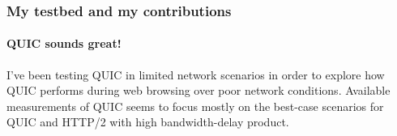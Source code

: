
\begin{frame}
    \frametitle{My testbed and my contributions}
    \framesubtitle{QUIC sounds great!}

    \begin{overprint}
        \uncover<+->{}

        I've been testing QUIC in limited network scenarios in order to explore how QUIC performs during web browsing over poor network conditions. Available measurements of QUIC seems to focus mostly on the best-case scenarios for QUIC and HTTP/2 with high bandwidth-delay product.
    \end{overprint}

\end{frame}


